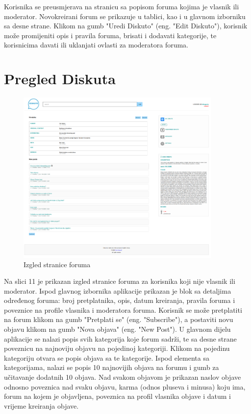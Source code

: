 \documentclass{foi}
\begin{document}
Korisnika se preusmjerava na stranicu sa popisom foruma kojima je vlasnik ili moderator. Novokreirani forum se prikazuje u tablici, kao i u glavnom izborniku sa desne strane. Klikom na gumb "Uredi Diskuto" (eng. "Edit Diskuto"), korisnik može promijeniti opis i pravila foruma, brisati i dodavati kategorije, te korisnicima davati ili uklanjati ovlasti za moderatora foruma.

\section{Pregled Diskuta}

\begin{figure}[h!]
    \centering
    \includegraphics[width=0.9\textwidth]{slike/forum.png}
    \caption{Izgled stranice foruma}
\end{figure}

Na slici 11 je prikazan izgled stranice foruma za korisnika koji nije vlasnik ili moderator. Ispod glavnog izbornika aplikacije prikazan je blok sa detaljima određenog foruma: broj pretplatnika, opis, datum kreiranja, pravila foruma i poveznice na profile vlasnika i moderatora foruma.  Korisnik se može pretplatiti na forum klikom na gumb "Pretplati se" (eng. "Subscribe"), a postaviti novu objavu klikom na gumb "Nova objava" (eng. "New Post"). U glavnom dijelu aplikacije se nalazi popis svih kategorija koje forum sadrži, te sa desne strane poveznicu na najnoviju objavu na pojedinoj kategoriji. Klikom na pojedinu kategoriju otvara se popis objava sa te kategorije. Ispod elementa sa kategorijama, nalazi se popis 10 najnovijih objava na forumu i gumb za učitavanje dodatnih 10 objava. Nad svakom objavom je prikazan naslov objave odnosno poveznica nad svaku objavu, karma (odnos pluseva i minusa) koju ima, forum na kojem je objavljena, poveznica na profil vlasnika objave i datum i vrijeme kreiranja objave.
\end{document}
